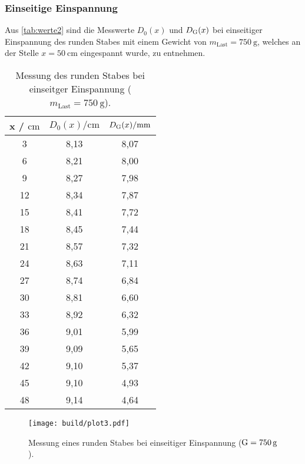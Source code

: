 \subsubsection{Einseitige Einspannung}
\label{subsubsec:rundEinsEing}

Aus \autoref{tab:werte2} sind die Messwerte $D_0(x)$ und $D_{\text G}(x)$ bei einseitiger Einspannung des runden Stabes mit
einem Gewicht von $m_{\text{Last}} = \SI{750}{\gram}$, welches an der Stelle $x= \SI{50}{\cm}$ eingespannt wurde, zu entnehmen.


\sloppy
\begin{table}[H]
  \centering
  \caption{Messung des runden Stabes bei einseitger Einspannung ($m_{\text{Last}} = \SI{750}{\gram}$).}
  \label{tab:werte2}
  \begin{tabular}{c c c}
    \toprule
    x / $\si{\centi\meter} $ & $ D_0(x) / \si{\centi\meter}$ & $D_{\text G}(x) / \si{\milli\meter}$ \\
    \midrule
    3 & 8,13 & 8,07 \\
    6 & 8,21 & 8,00 \\
    9 & 8,27 & 7,98 \\
    12 & 8,34 & 7,87 \\
    15 & 8,41 & 7,72 \\
    18 & 8,45 & 7,44 \\
    21 & 8,57 & 7,32 \\
    24 & 8,63 & 7,11 \\
    27 & 8,74 & 6,84 \\
    30 & 8,81 & 6,60 \\
    33 & 8,92 & 6,32 \\
    36 & 9,01 & 5,99 \\
    39 & 9,09 & 5,65 \\
    42 & 9,10 & 5,37 \\
    45 & 9,10 & 4,93 \\
    48 & 9,14 & 4,64 \\
    \bottomrule
  \end{tabular}
\end{table}

\sloppy
\begin{figure}[H]
  \centering
  \texttt{[image: build/plot3.pdf]}
  \caption{Messung eines runden Stabes bei einseitiger Einspannung ($\text G = \SI{750}{\gram}$).}
  \label{fig:plot3}
\end{figure}

